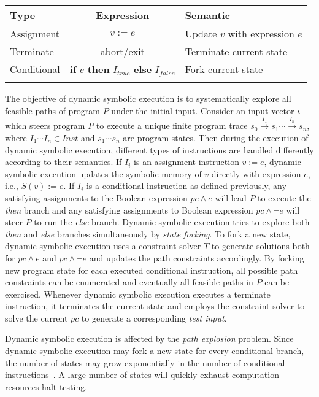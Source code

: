 \begin{table}[!b]
{\begin{tabular*}{20pc}{@{\extracolsep{\fill}}lcl@{}}\toprule
Type  & Expression & Semantic\\
\midrule
Assignment   &  $v:=e$ & Update $v$ with expression $e$\\
Terminate    &  abort/exit & Terminate current state \\
Conditional  &  \textbf{if} $e$ \textbf{then} $I_{true}$ \textbf{else} $I_{false}$ & Fork current state\\
\botrule
\end{tabular*}}{}
\end{table}

The objective of dynamic symbolic execution is to systematically
explore all feasible paths of program $P$ under the initial input.
Consider an input vector $\iota$ which steers program $P$ to execute a
unique finite program trace
$s_0\xrightarrow{I_1}s_1\cdots\xrightarrow{I_n}s_n$, where $I_1\cdots
I_n\in Inst$ and $s_1\cdots s_n$ are program states. Then during the
execution of dynamic symbolic execution, different types of
instructions are handled differently according to their semantics. If
$I_i$ is an assignment instruction $v:=e$, dynamic symbolic execution
updates the symbolic memory of $v$ directly with expression $e$, i.e.,
$S(v):= e$. If $I_i$ is a conditional instruction as defined
previously, any satisfying assignments to the Boolean expression
$pc\wedge e$ will lead $P$ to execute the \textit{then} branch and any
satisfying assignments to Boolean expression $pc\wedge\neg e$ will
steer $P$ to run the \textit{else} branch. Dynamic symbolic execution
tries to explore both \textit{then} and \textit{else} branches
simultaneously by \textit{state forking}. To fork a new state, dynamic
symbolic execution uses a constraint solver $T$ to generate
solutions both for $pc\wedge e$ and $pc\wedge\neg e$ and updates the
path constraints accordingly. By forking new program state for each
executed conditional instruction, all possible path constraints can be
enumerated and eventually all feasible paths in $P$ can be exercised.
Whenever dynamic symbolic execution executes a terminate instruction,
it terminates the current state and employs the constraint solver to
solve the current $pc$ to generate a corresponding \textit{test input}.

Dynamic symbolic execution is affected by the \textit{path explosion}
problem. Since dynamic symbolic execution may fork a new state for
every conditional branch, the number of states may grow exponentially
in the number of conditional instructions~\cite{cadar2013symbolic}. A
large number of states will quickly exhaust computation resources halt
testing.


